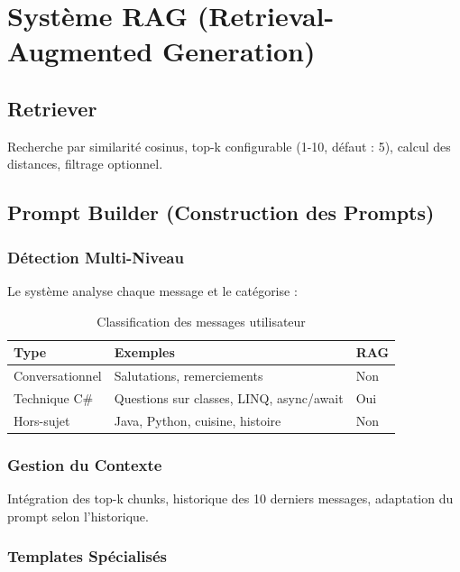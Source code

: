 \documentclass[12pt,a4paper]{report}
\begin{document}
\section{Système RAG (Retrieval-Augmented Generation)}

\subsection{Retriever}

Recherche par similarité cosinus, top-k configurable (1-10, défaut : 5), calcul des distances, filtrage optionnel.

\subsection{Prompt Builder (Construction des Prompts)}

\subsubsection{Détection Multi-Niveau}

Le système analyse chaque message et le catégorise :

\begin{table}[H]
    \centering
    \renewcommand{\arraystretch}{1.3}
    \begin{tabularx}{\textwidth}{|l|X|l|}
        \hline
        \rowcolor{green!20}
        \textbf{Type} & \textbf{Exemples} & \textbf{RAG} \\
        \hline
        Conversationnel & Salutations, remerciements & Non \\
        \hline
        Technique C\# & Questions sur classes, LINQ, async/await & Oui \\
        \hline
        Hors-sujet & Java, Python, cuisine, histoire & Non \\
        \hline
    \end{tabularx}
    \caption{Classification des messages utilisateur}
\end{table}

\subsubsection{Gestion du Contexte}

Intégration des top-k chunks, historique des 10 derniers messages, adaptation du prompt selon l'historique.

\subsubsection{Templates Spécialisés}
\end{document}
